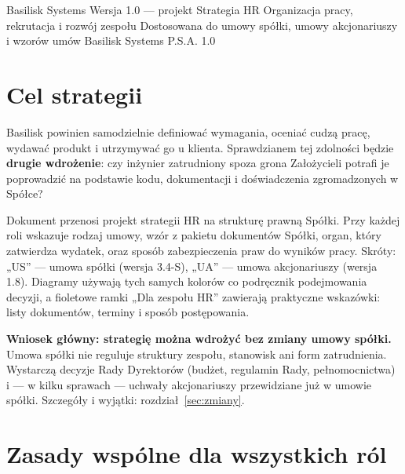 \documentclass[11pt,a4paper]{report}
\begin{document}
\BusinessPlanTitlePage
  {Basilisk Systems}
  {Wersja 1.0 --- projekt}
  {Strategia HR}
  {Organizacja pracy, rekrutacja i rozwój zespołu}
  {Dostosowana do umowy spółki, umowy akcjonariuszy i wzorów umów Basilisk Systems P.S.A.}
  {1.0}

\tableofcontents
\newpage

\section{Cel strategii}

Basilisk powinien samodzielnie definiować wymagania, oceniać cudzą pracę, wydawać produkt i utrzymywać go u klienta. Sprawdzianem tej zdolności będzie \textbf{drugie wdrożenie}: czy inżynier zatrudniony spoza grona Założycieli potrafi je poprowadzić na podstawie kodu, dokumentacji i doświadczenia zgromadzonych w Spółce?

Dokument przenosi projekt strategii HR na strukturę prawną Spółki. Przy każdej roli wskazuje rodzaj umowy, wzór z pakietu dokumentów Spółki, organ, który zatwierdza wydatek, oraz sposób zabezpieczenia praw do wyników pracy. Skróty: „US” --- umowa spółki (wersja 3.4-S), „UA” --- umowa akcjonariuszy (wersja 1.8). Diagramy używają tych samych kolorów co podręcznik podejmowania decyzji, a fioletowe ramki „Dla zespołu HR” zawierają praktyczne wskazówki: listy dokumentów, terminy i sposób postępowania.

\begin{Decyzja}
\textbf{Wniosek główny: strategię można wdrożyć bez zmiany umowy spółki.} Umowa spółki nie reguluje struktury zespołu, stanowisk ani form zatrudnienia. Wystarczą decyzje Rady Dyrektorów (budżet, regulamin Rady, pełnomocnictwa) i --- w kilku sprawach --- uchwały akcjonariuszy przewidziane już w umowie spółki. Szczegóły i wyjątki: rozdział~\ref{sec:zmiany}.
\end{Decyzja}

\section{Zasady wspólne dla wszystkich ról}
\label{sec:zasady}
\end{document}

